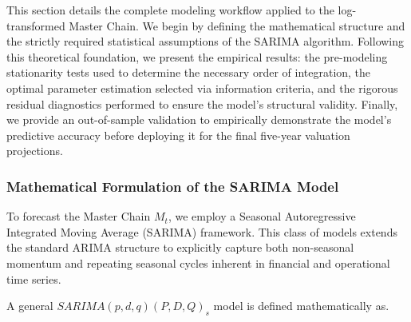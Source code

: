 This section details the complete modeling workflow applied to the log-transformed Master Chain. We begin by defining the mathematical structure and the strictly required statistical assumptions of the SARIMA algorithm. Following this theoretical foundation, we present the empirical results: the pre-modeling stationarity tests used to determine the necessary order of integration, the optimal parameter estimation selected via information criteria, and the rigorous residual diagnostics performed to ensure the model's structural validity. Finally, we provide an out-of-sample validation to empirically demonstrate the model's predictive accuracy before deploying it for the final five-year valuation projections.
\subsubsection{Mathematical Formulation of the SARIMA Model}
To forecast the Master Chain $M_t$, we employ a Seasonal Autoregressive Integrated Moving Average (SARIMA) framework. This class of models extends the standard ARIMA structure to explicitly capture both non-seasonal momentum and repeating seasonal cycles inherent in financial and operational time series.


A general $SARIMA(p,d,q)(P,D,Q)_s$ model is defined mathematically as.

